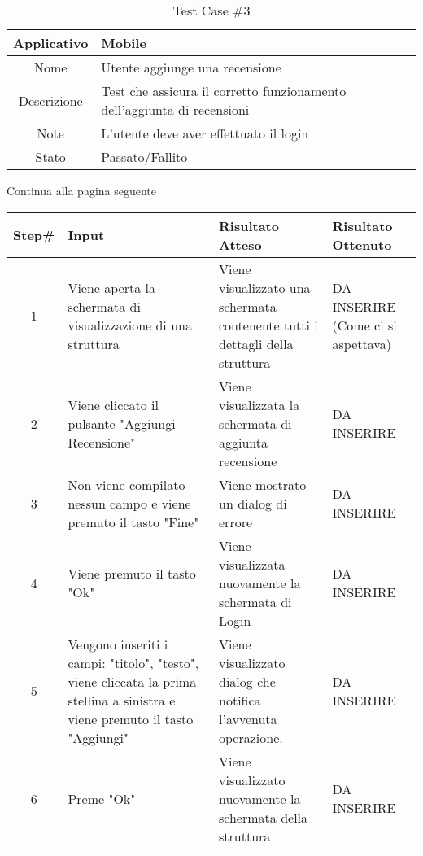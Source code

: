 
\begin{table}[H]
    \centering
    \footnotesize
    \caption{Test Case \#3}
    \begin{tabularx}{\textwidth}{|c|X|}
        \hline
        Applicativo & Mobile\\
        \hline
        Nome & Utente aggiunge una recensione  \\
        \hline
        Descrizione & Test che assicura il corretto funzionamento dell'aggiunta di recensioni\\
        \hline
        Note &  L'utente deve aver effettuato il login\\
        \hline
        Stato & Passato/Fallito\\
        \hline

    \end{tabularx}
    Continua alla pagina seguente
    \setlength{\tabcolsep}{8pt}
    \renewcommand{\arraystretch}{1.5}
\end{table}
\begin{table}[H]
    \footnotesize
    \begin{tabularx}{\textwidth}{|c|X|X|X|}
        \hline
        Step\# & Input & Risultato Atteso & Risultato Ottenuto \\
        \hline
         1 & Viene aperta la schermata di visualizzazione di una struttura
         & Viene visualizzato una schermata contenente tutti i dettagli della struttura
         &DA INSERIRE (Come ci si aspettava)\\
          \hline
        2 & Viene cliccato il pulsante "Aggiungi Recensione"
        & Viene visualizzata la schermata di aggiunta recensione
        & DA INSERIRE\\
         \hline 
        3 & Non viene compilato nessun campo e viene premuto il tasto "Fine"
         & Viene mostrato un dialog di errore & DA INSERIRE\\
          \hline
        4 & Viene premuto il tasto "Ok"
         & Viene visualizzata nuovamente la schermata di Login
         & DA INSERIRE\\
          \hline 
          5 & Vengono inseriti i campi: "titolo", "testo", viene cliccata la prima stellina a sinistra e viene premuto il tasto "Aggiungi"
         & Viene visualizzato dialog che notifica l'avvenuta operazione.
         & DA INSERIRE\\
          \hline 
          6 & Preme "Ok"
          & Viene visualizzato nuovamente la schermata della struttura
          & DA INSERIRE\\
           \hline                     
    \end{tabularx}
\end{table}
    
       
